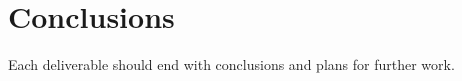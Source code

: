 
\clearpage
\section{Conclusions}
\label{sec:conclusions}


Each deliverable should end with conclusions and plans for further work.

